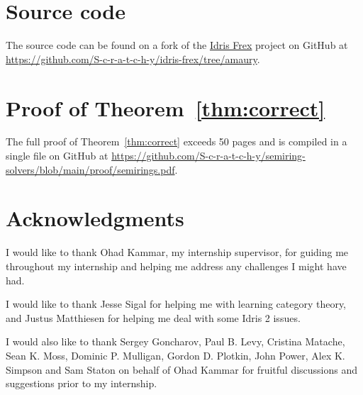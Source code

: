 

\section{Source code}
\label{sec:source_code}

The source code can be found on a fork of the \href{https://github.com/frex-project/idris-frex}{Idris Frex} project on GitHub at \url{https://github.com/S-c-r-a-t-c-h-y/idris-frex/tree/amaury}.

\section{Proof of Theorem~\ref{thm:correct}}
\label{sec:full_proof}

The full proof of Theorem~\ref{thm:correct} exceeds 50 pages and is compiled in a single file on GitHub at \url{https://github.com/S-c-r-a-t-c-h-y/semiring-solvers/blob/main/proof/semirings.pdf}.



\section*{Acknowledgments}

I would like to thank Ohad Kammar, my internship supervisor, for guiding me throughout my internship and helping me address any challenges I might have had.

I would like to thank Jesse Sigal for helping me with learning category theory, and Justus Matthiesen for helping me deal with some Idris 2 issues.

I would also like to thank Sergey Goncharov, Paul B. Levy, Cristina Matache, Sean K. Moss, Dominic P. Mulligan, Gordon D. Plotkin, John Power, Alex K. Simpson and Sam Staton on behalf of Ohad Kammar for fruitful discussions and suggestions prior to my internship.